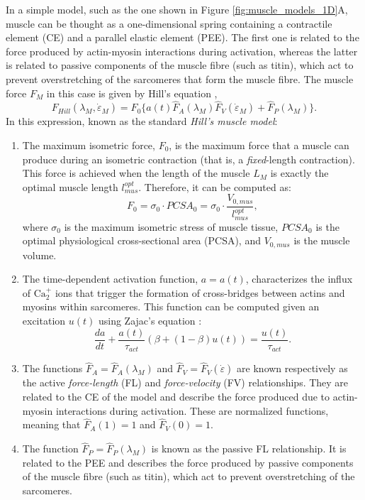 \documentclass{sfuthesis}
\numberwithin{equation}{chapter}
\numberwithin{figure}{chapter}
\numberwithin{table}{chapter}
\theoremstyle{definition}
\newcommand{\depsilon}{\dot{\varepsilon}}
\begin{document}
In a simple model, such as the one shown in Figure \ref{fig:muscle_models_1D}A, muscle can be thought as a one-dimensional spring containing a contractile element (CE) and a parallel elastic element (PEE). The first one is related to the force produced by actin-myosin interactions during activation, whereas the latter is related to passive components of the muscle fibre (such as titin), which act to prevent overstretching of the sarcomeres that form the muscle fibre. The muscle force $F_M$ in this case is given by Hill's equation \cite{Zajac1989},
\begin{equation} \label{eq:Hill_force}
    F_{Hill}(\lambda_M, \depsilon_M) = F_0 \Big\{ a(t) \widehat{F}_A(\lambda_M) \widehat{F}_V(\depsilon_M) + \widehat{F}_P(\lambda_M) \Big\}.
\end{equation}
In this expression, known as the standard \textit{Hill's muscle model}:
\begin{enumerate}
    \item The maximum isometric force, $F_0$, is the maximum force that a muscle can produce during an isometric contraction (that is, a \textit{fixed}-length contraction). This force is achieved when the length of the muscle $L_M$ is exactly the optimal muscle length $l_{mus}^{opt}$. Therefore, it can be computed as:
    \begin{equation}
        F_0 = \sigma_0 \cdot PCSA_0 = \sigma_0 \cdot \dfrac{V_{0,mus}}{l_{mus}^{opt}},
    \end{equation}
    where $\sigma_0$ is the maximum isometric stress of muscle tissue, $PCSA_0$ is the optimal physiological cross-sectional area (PCSA), and $V_{0,mus}$ is the muscle volume.
    \item The time-dependent activation function, $a = a(t)$, characterizes the influx of $\mathrm{Ca}_2^+$ ions that trigger the formation of cross-bridges between actins and myosins within sarcomeres. This function can be computed given an excitation $u(t)$ using Zajac's equation \cite{Zajac1989}:
    \begin{equation} \label{eq:zajac}
        \dfrac{da}{dt} + \dfrac{a(t)}{\tau_{act}} \left( \beta + (1-\beta)u(t) \right) = \dfrac{u(t)}{\tau_{act}}.
    \end{equation}
    \item The functions $\widehat{F}_A = \widehat{F}_A(\lambda_M)$ and $\widehat{F}_V = \widehat{F}_V(\depsilon)$ are known respectively as the active \textit{force-length} (FL) and \textit{force-velocity} (FV) relationships. They are related to the CE of the model and describe the force produced due to actin-myosin interactions during activation. These are normalized functions, meaning that $\widehat{F}_A(1) = 1$ and $\widehat{F}_V(0) = 1$.
    \item The function $\widehat{F}_P = \widehat{F}_P(\lambda_M)$ is known as the passive FL relationship. It is related to the PEE and describes the force produced by passive components of the muscle fibre (such as titin), which act to prevent overstretching of the sarcomeres.
\end{enumerate} 
\end{document}
